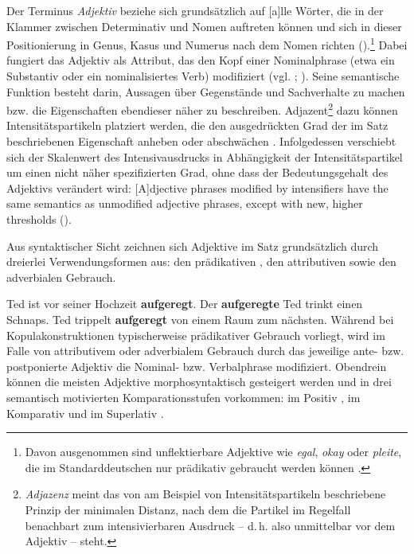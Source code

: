 Der Terminus \textit{Adjektiv} beziehe sich grundsätzlich auf \glqq{}[a]lle Wörter, die in der Klammer zwischen Determinativ und Nomen auftreten können und sich in dieser Positionierung in Genus, Kasus und Numerus nach dem Nomen richten\grqq{} (\citealt[1]{Trost.2006}).\footnote{Davon ausgenommen sind unflektierbare Adjektive wie \textit{egal}, \textit{okay} oder \textit{pleite}, die im Standarddeutschen nur prädikativ gebraucht werden können {\citep[vgl.][17]{Pittner.2015}}.} Dabei fungiert das Adjektiv als Attribut, das den Kopf einer Nominalphrase (etwa ein Substantiv oder ein nominalisiertes Verb) modifiziert (vgl. \citealt[46]{Zifonun.1997}; \citealt[2]{Trost.2006}). Seine semantische Funktion besteht darin, Aussagen über Gegenstände und Sachverhalte zu machen bzw. die Eigenschaften ebendieser näher zu beschreiben. %
Adjazent\footnote{\textit{Adjazenz} meint das von \citet[219]{Os.1989} am Beispiel von Intensitätspartikeln beschriebene \glqq{}Prinzip der minimalen Distanz\grqq{}, nach dem die Partikel im Regelfall benachbart zum intensivierbaren Ausdruck -- d.\,h. also unmittelbar vor dem Adjektiv -- steht.} dazu
können Intensitätspartikeln platziert werden, die den ausgedrückten Grad der im Satz beschriebenen Eigenschaft anheben oder abschwächen {\citep[vgl.][25]{Pittner.2015}}. Infolgedessen verschiebt sich der Skalenwert des Intensivausdrucks in Abhängigkeit der Intensitätspartikel um einen nicht näher spezifizierten Grad, ohne dass der Bedeutungsgehalt des Adjektivs verändert wird: \glqq{}[A]djective phrases modified by intensifiers have the same semantics as unmodified adjective phrases, except with new, higher thresholds\grqq{} (\citealt[148]{Bennett.2018}).

Aus syntaktischer Sicht zeichnen sich Adjektive im Satz grundsätzlich durch dreierlei Verwendungsformen aus: den prädikativen , den attributiven  sowie den adverbialen  Gebrauch.

\ea   \label{ted0}
\ea Ted ist vor seiner Hochzeit \textbf{aufgeregt}. \label{ted1}
\ex Der \textbf{aufgeregte} Ted trinkt einen Schnaps. \label{ted2}
\ex Ted trippelt \textbf{aufgeregt} von einem Raum zum nächsten. \label{ted3}
 \z
 \z
Während bei Kopulakonstruktionen typischerweise prädikativer Gebrauch vorliegt, wird im Falle von attributivem oder adverbialem Gebrauch durch das jeweilige ante- bzw. postponierte Adjektiv die Nominal- bzw. Verbalphrase modifiziert. Obendrein können die meisten Adjektive morphosyntaktisch gesteigert werden und in drei semantisch motivierten Komparationsstufen vorkommen: im Positiv , im Komparativ  und im Superlativ .

